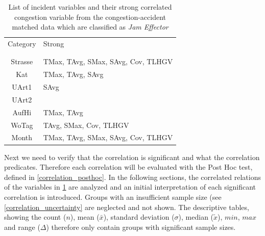 \begin{table}[h!]
	\centering
	\begin{tabular}{c|l}  
		Category & Strong \\
		\\[-1em]
		\hline
		\\[-1em]
		Strasse & TMax, TAvg, SMax, SAvg, Cov, TLHGV \\ 
 		Kat & TMax, TAvg, SAvg \\ %
 		UArt1 & SAvg \\ %
 		UArt2 & \\ %
 		AufHi & TMax, TAvg \\
 		WoTag & TAvg, SMax, Cov, TLHGV \\ %
 		Month & TMax, TAvg, SMax, SAvg, Cov, TLHGV \\ %
	\end{tabular}
    \caption{List of incident variables and their strong correlated congestion variable from the congestion-accident matched data which are classified as \textit{Jam Effector}}
	\label{tbl:correlation_list_baysis_effector}
\end{table}
Next we need to verify that the correlation is significant and what the correlation predicates. Therefore each correlation will be evaluated with the Post Hoc test, defined in \cref{correlation_posthoc}. In the following sections, the correlated relations of the variables in \cref{tbl:correlation_list_baysis_effector} are analyzed and an initial interpretation of each significant correlation is introduced. Groups with an insufficient sample size (see \cref{correlation_uncertainty} are neglected and not shown. The descriptive tables, showing the count ($n$), mean ($\bar{x}$), standard deviation ($\sigma$), median ($\tilde{x}$), $min$, $max$ and range ($\Delta$) therefore only contain groups with significant sample sizes.
